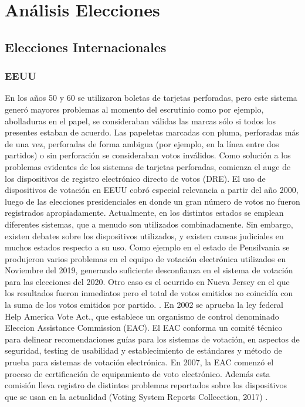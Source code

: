 \label{Elecciones}
\chapter{Análisis Elecciones}
\section{Elecciones Internacionales}
\subsection{EEUU}
En los años 50 y 60 se utilizaron boletas de tarjetas perforadas, pero este sistema generó mayores problemas al momento del escrutinio como por ejemplo, abolladuras en el papel, se consideraban válidas las marcas sólo si todos los presentes estaban de acuerdo. Las papeletas marcadas con pluma, perforadas más de una vez, perforadas de forma ambigua (por ejemplo, en la línea entre dos partidos) o sin perforación se consideraban votos inválidos.
Como solución a los problemas evidentes de los sistemas de tarjetas perforadas, comienza el auge de los dispositivos de registro electrónico directo de votos (DRE). El uso de dispositivos de votación en EEUU cobró especial relevancia a partir del año 2000, luego de las elecciones presidenciales en donde un gran número de votos no fueron registrados apropiadamente.  \newline
Actualmente, en los distintos estados se emplean diferentes sistemas, que a menudo son utilizados combinadamente. Sin embargo, existen debates sobre los dispositivos utilizados, y existen causas judiciales en muchos estados respecto a su uso. Como ejemplo en el estado de Pensilvania se produjeron varios problemas en el equipo de votación electrónica utilizados en Noviembre del 2019, generando suficiente desconfianza en el sistema de votación para las elecciones del 2020. Otro caso es el ocurrido en Nueva Jersey en el que los resultados fueron inmediatos pero el total de votos emitidos no coincidía con la suma de los votos emitidos por partido. \cite{eleccionesEEUU}.
En 2002 se aprueba la ley federal Help America Vote Act., que establece un organismo de control denominado Eleccion Assistance Commission (EAC). El EAC conforma un comité técnico para delinear recomendaciones guías para los sistemas de votación, en aspectos de seguridad, testing de usabilidad y establecimiento de estándares y método de prueba para sistemas de votación electrónica. En 2007, la EAC comenzó el proceso de certificación de equipamiento de voto electrónico. Además esta comisión lleva registro de distintos problemas reportados sobre los dispositivos que se usan en la actualidad (Voting System Reports Collecction, 2017) \cite{problemasReportados}.

